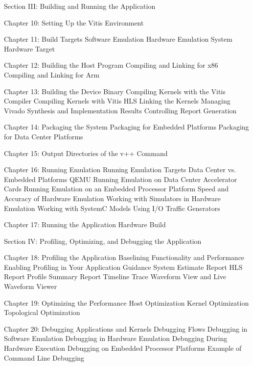 \iffalse 
Section  III: Building and Running the Application   

    Chapter 10: Setting Up the Vitis Environment     

    Chapter 11: Build Targets   
        Software Emulation    
        Hardware Emulation    
        System Hardware Target        

    Chapter 12: Building the Host Program
        Compiling and Linking for x86        
        Compiling and Linking for Arm       

    Chapter 13: Building the Device Binary  
        Compiling Kernels with the Vitis Compiler     
        Compiling Kernels with Vitis HLS        
        Linking the Kernels
        Managing Vivado Synthesis and Implementation Results      
        Controlling Report Generation      

    Chapter 14: Packaging the System        
        Packaging for Embedded Platforms        
        Packaging for Data Center Platforms 

    Chapter 15: Output Directories of the v++ Command     

    Chapter 16: Running Emulation      
        Running Emulation Targets 
        Data Center vs. Embedded Platforms       
        QEMU 
        Running Emulation on Data Center Accelerator Cards
        Running Emulation on an Embedded Processor Platform  
        Speed and Accuracy of Hardware Emulation 
        Working with Simulators in Hardware Emulation        
        Working with SystemC Models        
        Using I/O Traffic Generators       

    Chapter 17: Running the Application Hardware Build     


Section  IV: Profiling, Optimizing, and Debugging the Application

    Chapter 18: Profiling the Application       
        Baselining Functionality and Performance
        Enabling Profiling in Your Application  
        Guidance     
        System Estimate Report
        HLS Report   
        Profile Summary Report
        Timeline Trace        
        Waveform View and Live Waveform Viewer  

    Chapter 19: Optimizing the Performance  
        Host Optimization  
        Kernel Optimization
        Topological Optimization

    Chapter 20: Debugging Applications and Kernels   
        Debugging Flows    
        Debugging in Software Emulation      
        Debugging in Hardware Emulation      
        Debugging During Hardware Execution  
        Debugging on Embedded Processor Platforms     
        Example of Command Line Debugging


